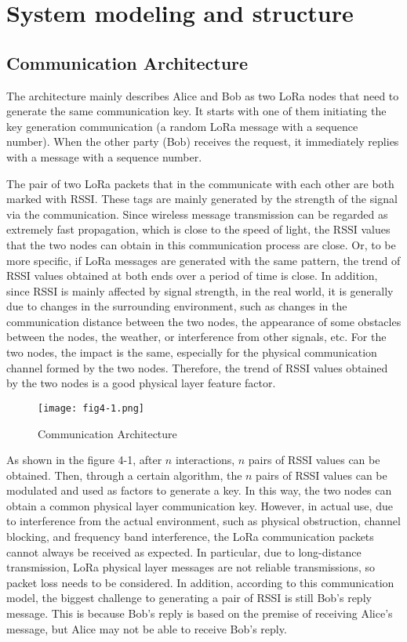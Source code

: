 
\chapter{System modeling and structure}

\section{Communication Architecture}

The architecture mainly describes Alice and Bob as two LoRa nodes that need to generate the same communication key. It starts with one of them initiating the key generation communication (a random LoRa message with a sequence number). When the other party (Bob) receives the request, it immediately replies with a message with a sequence number.

The pair of two LoRa packets that in the communicate with each other are both marked with RSSI. These tags are mainly generated by the strength of the signal via the communication. Since wireless message transmission can be regarded as extremely fast propagation, which is close to the speed of light, the RSSI values that the two nodes can obtain in this communication process are close. Or, to be more specific, if LoRa messages are generated with the same pattern, the trend of RSSI values obtained at both ends over a period of time is close.
In addition, since RSSI is mainly affected by signal strength, in the real world, it is generally due to changes in the surrounding environment, such as changes in the communication distance between the two nodes, the appearance of some obstacles between the nodes, the weather, or interference from other signals, etc. For the two nodes, the impact is the same, especially for the physical communication channel formed by the two nodes. Therefore, the trend of RSSI values obtained by the two nodes is a good physical layer feature factor.
\begin{figure}
  \centering
  \texttt{[image: fig4-1.png]}
  \caption{Communication Architecture}
  \label{fig:4-1}
\end{figure}
As shown in the figure 4-1, after \(n\) interactions, \(n\) pairs of RSSI values can be obtained. Then, through a certain algorithm, the \(n\) pairs of RSSI values can be modulated and used as factors to generate a key. In this way, the two nodes can obtain a common physical layer communication key. 
However, in actual use, due to interference from the actual environment, such as physical obstruction, channel blocking, and frequency band interference, the LoRa communication packets cannot always be received as expected. In particular, due to long-distance transmission, LoRa physical layer messages are not reliable transmissions, so packet loss needs to be considered. In addition, according to this communication model, the biggest challenge to generating a pair of RSSI is still Bob's reply message. This is because Bob's reply is based on the premise of receiving Alice's message, but Alice may not be able to receive Bob's reply.
